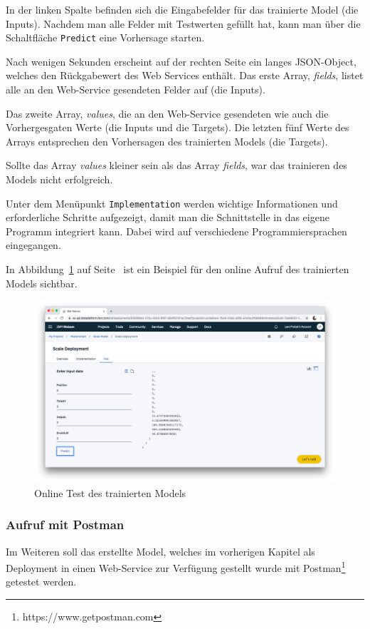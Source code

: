 In der linken Spalte befinden sich die Eingabefelder für das trainierte Model (die Inputs). Nachdem man alle Felder mit
Testwerten gefüllt hat, kann man über die Schaltfläche \texttt{Predict} eine Vorhersage starten.

Nach wenigen Sekunden erscheint auf der rechten Seite ein langes JSON-Object, welches den Rückgabewert des Web Services
enthält. Das erste Array, \textit{fields}, listet alle an den Web-Service gesendeten Felder auf (die Inputs).

Das zweite Array, \textit{values}, die an den Web-Service gesendeten wie auch die Vorhergesgaten Werte (die Inputs und
die Targets). Die letzten fünf Werte des Arrays entsprechen den Vorhersagen des trainierten Models (die Targets).

Sollte das Array \textit{values} kleiner sein als das Array \textit{fields}, war das trainieren des Models nicht
erfolgreich.

Unter dem Menüpunkt \texttt{Implementation} werden wichtige Informationen und erforderliche Schritte aufgezeigt, damit
man die Schnittstelle in das eigene Programm integriert kann. Dabei wird auf verschiedene Programmiersprachen eingegangen.

In Abbildung~\ref{fig:umsetzung_deployment_test} auf Seite~\pageref{fig:umsetzung_deployment_test} ist ein Beispiel für
den online Aufruf des trainierten Models sichtbar.

\begin{figure}[h]
    \centering
    \includegraphics[scale=0.26]{images/kapitel_3/deployment_test.png}
    \caption{Online Test des trainierten Models}
    \label{fig:umsetzung_deployment_test}
\end{figure}

\subsubsection{Aufruf mit Postman}
\label{subsec:Aufruf mit Postman}
Im Weiteren soll das erstellte Model, welches im vorherigen Kapitel als Deployment in einen Web-Service zur Verfügung
gestellt wurde mit Postman\footnote{https://www.getpostman.com} getestet werden.

